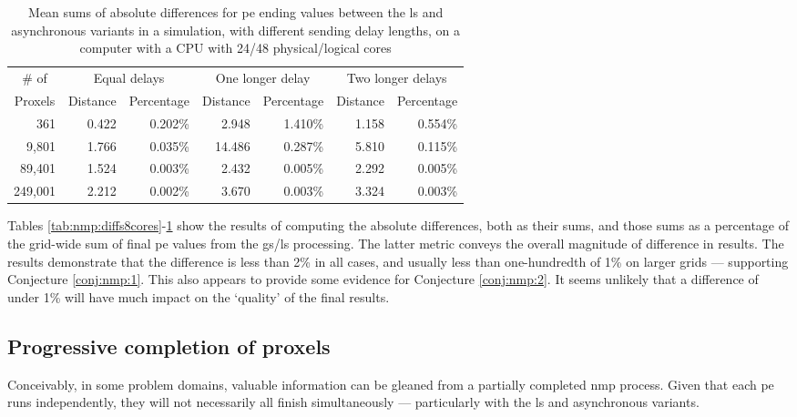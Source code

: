 \begin{table}
\centering
\begin{tabular}{@{}r|rr|rr|rr@{}}
\toprule
\multicolumn{1}{c|}{\# of}   & \multicolumn{2}{c|}{Equal delays} & \multicolumn{2}{c|}{One longer delay} & \multicolumn{2}{c}{Two longer delays} \\ \cmidrule(l){2-7} 
\multicolumn{1}{c|}{Proxels} & Distance     & Percentage     & Distance      & Percentage      & Distance      & Percentage      \\ \midrule
361  & 0.422 & 0.202\% & 2.948 & 1.410\% & 1.158 & 0.554\% \\
9,801  & 1.766 & 0.035\% & 14.486 & 0.287\% & 5.810 & 0.115\% \\
89,401  & 1.524 & 0.003\% & 2.432 & 0.005\% & 2.292 & 0.005\% \\
249,001  & 2.212 & 0.002\% & 3.670 & 0.003\% & 3.324 & 0.003\% \\ \bottomrule
\end{tabular}%
\caption[Mean sums of absolute differences for \acrshort{pe} ending values between the \gls{ls} and asynchronous variants]{Mean sums of absolute differences for \gls{pe} ending values between the \gls{ls} and asynchronous variants in a simulation, with different sending delay lengths, on a computer with a CPU with 24/48 physical/logical cores}
\label{tab:nmp:diffs48cores}
\end{table}

Tables \ref{tab:nmp:diffs8cores}-\ref{tab:nmp:diffs48cores} show the results of computing the absolute differences, both as their sums, and those sums as a percentage of the grid-wide sum of final \gls{pe} values from the \gls{gs}/\gls{ls} processing.  The latter metric conveys the overall magnitude of difference in results.  The results demonstrate that the difference is less than 2\% in all cases, and usually less than one-hundredth of 1\% on larger grids --- supporting Conjecture \ref{conj:nmp:1}.  This also appears to provide some evidence for Conjecture \ref{conj:nmp:2}.  It seems unlikely that a difference of under 1\% will have much impact on the `quality' of the final results.

\subsection{Progressive completion of proxels}
Conceivably, in some problem domains, valuable information can be gleaned from a partially completed \gls{nmp} process.  Given that each \gls{pe} runs independently, they will not necessarily all finish simultaneously --- particularly with the \gls{ls} and asynchronous variants.

